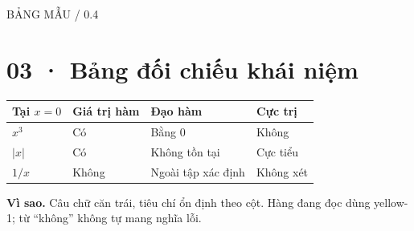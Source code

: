 \documentclass[11pt,a4paper]{article}
\newcommand{\tagline}[1]{{\small\color{muted}\MakeUppercase{#1}}\par}
\newcommand{\why}[1]{\par{\small\color{muted}\textbf{Vì sao.} #1}\par}
\begin{document}
\tagline{Bảng mẫu / 0.4}\section*{03 · Bảng đối chiếu khái niệm}
\begin{tabularx}{\linewidth}{|>{\raggedright\arraybackslash}X|>{\raggedright\arraybackslash}X|>{\raggedright\arraybackslash}X|>{\raggedright\arraybackslash}X|}\hline
\rowcolor{head}Tại $x=0$ & Giá trị hàm & Đạo hàm & Cực trị\\\hline
$x^3$ & Có & Bằng 0 & Không\\\hline
$|x|$ & Có & Không tồn tại & Cực tiểu\\\hline
$1/x$ & Không & Ngoài tập xác định & Không xét\\\hline
\end{tabularx}\why{Câu chữ căn trái, tiêu chí ổn định theo cột. Hàng đang đọc dùng yellow-1; từ “không” không tự mang nghĩa lỗi.}
\end{document}
